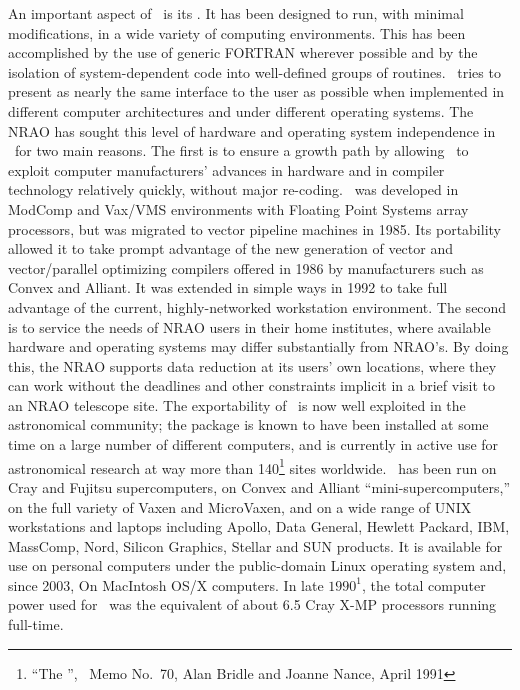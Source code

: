     An important aspect of \AIPS\ is its .  It has
been designed to run, with minimal modifications, in a wide variety of
computing environments.  This has been accomplished by the use of
generic FORTRAN wherever possible and by the isolation of
system-dependent code into well-defined groups of routines.  \AIPS\
tries to present as nearly the same interface to the user as possible
when implemented in different computer architectures and under
different operating systems.  The NRAO has sought this level of
hardware and operating system independence in \AIPS\ for two main
reasons.  The first is to ensure a growth path by allowing \AIPS\ to
exploit computer manufacturers' advances in hardware and in compiler
technology relatively quickly, without major re-coding.  \AIPS\ was
developed in ModComp and Vax/VMS environments with Floating Point
Systems array processors, but was migrated to vector pipeline machines
in 1985.  Its portability allowed it to take prompt advantage of the
new generation of vector and vector/parallel optimizing compilers
offered in 1986 by manufacturers such as Convex and Alliant.  It was
extended in simple ways in 1992 to take full advantage of the current,
highly-networked workstation environment.  The second is to service
the needs of NRAO users in their home institutes, where available
hardware and operating systems may differ substantially from NRAO's.
By doing this, the NRAO supports data reduction at its users' own
locations, where they can work without the deadlines and other
constraints implicit in a brief visit to an NRAO telescope site.  The
exportability of \AIPS\ is now well exploited in the astronomical
community; the package is known to have been installed at some time on
a large number of different computers, and is currently in active use
for astronomical research at way more than 140\footnote{``The
'', \AIPS\ Memo No.~70, Alan Bridle and
Joanne Nance, April 1991} sites worldwide.  \AIPS\ has been run on
Cray and Fujitsu supercomputers, on Convex and Alliant
``mini-supercomputers,'' on the full variety of Vaxen and MicroVaxen,
and on a wide range of UNIX workstations and laptops including Apollo,
Data General, Hewlett Packard, IBM, MassComp, Nord, Silicon Graphics,
Stellar and SUN products.  It is available for use on personal
computers under the public-domain Linux operating system and, since
2003, On MacIntosh OS/X computers.  In late $1990^1$, the total
computer power used for \AIPS\ was the equivalent of about 6.5 Cray
X-MP processors running full-time.


